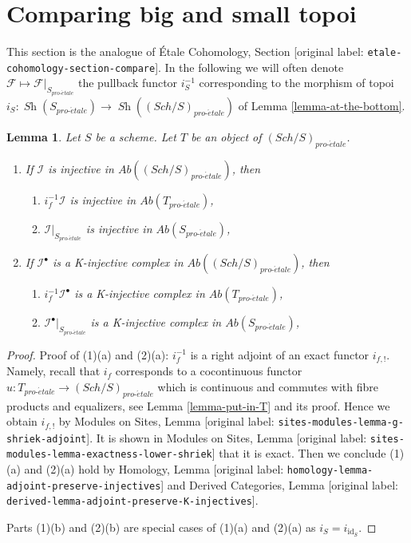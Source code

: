 \documentclass[10pt,a4paper]{article}
\theoremstyle{plain}
\newtheorem{lemma}[subsection]{Lemma}
\theoremstyle{definition}
\theoremstyle{remark}
\numberwithin{equation}{subsection}
\def\Sch{\mathit{Sch}}
\def\Sh{\mathop{\mathit{Sh}}\nolimits}
\def\proetale{{pro\text{-}\acute{e}tale}}
\begin{document}
\section{Comparing big and small topoi}
\label{section-compare}

\noindent
This section is the analogue of \'Etale Cohomology, Section
\textnormal{[original label: \nolinkurl{etale-cohomology-section-compare}]}. In the following we
will often denote $\mathcal{F} \mapsto \mathcal{F}|_{S_\proetale}$
the pullback functor $i_S^{-1}$ corresponding to
the morphism of topoi $i_S : \Sh(S_\proetale) \to \Sh((\Sch/S)_\proetale)$
of Lemma \ref{lemma-at-the-bottom}.

\begin{lemma}
\label{lemma-compare-injectives}
Let $S$ be a scheme. Let $T$ be an object of $(\Sch/S)_\proetale$.
\begin{enumerate}
\item If $\mathcal{I}$ is injective in $\textit{Ab}((\Sch/S)_\proetale)$, then
\begin{enumerate}
\item $i_f^{-1}\mathcal{I}$ is injective in $\textit{Ab}(T_\proetale)$,
\item $\mathcal{I}|_{S_\proetale}$ is injective in $\textit{Ab}(S_\proetale)$,
\end{enumerate}
\item If $\mathcal{I}^\bullet$ is a K-injective complex
in $\textit{Ab}((\Sch/S)_\proetale)$, then
\begin{enumerate}
\item $i_f^{-1}\mathcal{I}^\bullet$ is a K-injective complex in
$\textit{Ab}(T_\proetale)$,
\item $\mathcal{I}^\bullet|_{S_\proetale}$ is a K-injective complex in
$\textit{Ab}(S_\proetale)$,
\end{enumerate}
\end{enumerate}
\end{lemma}

\begin{proof}
Proof of (1)(a) and (2)(a): $i_f^{-1}$ is a right adjoint of an
exact functor $i_{f, !}$. Namely, recall that $i_f$ corresponds
to a cocontinuous functor $u : T_\proetale \to (\Sch/S)_\proetale$
which is continuous and commutes with fibre products and equalizers, see
Lemma \ref{lemma-put-in-T} and its proof. Hence we obtain $i_{f, !}$ by
Modules on Sites, Lemma \textnormal{[original label: \nolinkurl{sites-modules-lemma-g-shriek-adjoint}]}.
It is shown in Modules on Sites, Lemma
\textnormal{[original label: \nolinkurl{sites-modules-lemma-exactness-lower-shriek}]} that it is exact.
Then we conclude (1)(a) and (2)(a) hold by
Homology, Lemma \textnormal{[original label: \nolinkurl{homology-lemma-adjoint-preserve-injectives}]} and
Derived Categories, Lemma \textnormal{[original label: \nolinkurl{derived-lemma-adjoint-preserve-K-injectives}]}.

\medskip\noindent
Parts (1)(b) and (2)(b) are special cases of (1)(a) and (2)(a)
as $i_S = i_{\text{id}_S}$.
\end{proof}
\end{document}
